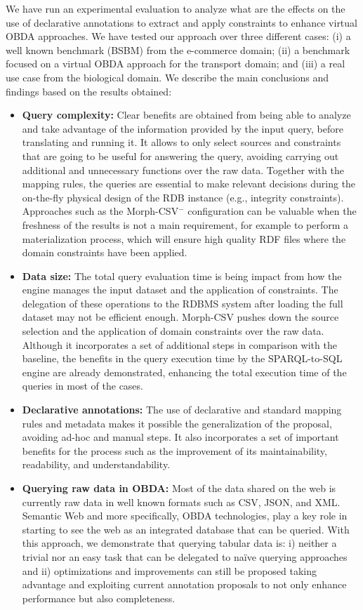 We have run an experimental evaluation to analyze what are the effects on the use of declarative annotations to extract and apply constraints to enhance virtual OBDA approaches. We have tested our approach over three different cases: (i) a well known benchmark (BSBM) from the e-commerce domain; (ii) a benchmark focused on a virtual OBDA approach for the transport domain; and (iii) a real use case from the biological domain. We describe the main conclusions and findings based on the results obtained:
\begin{itemize}
    \item \textbf{Query complexity:} Clear benefits are obtained from being able to analyze and take advantage of the information provided by the input query, before translating and running it. It allows to only select sources and constraints that are going to be useful for answering the query, avoiding carrying out additional and unnecessary functions over the raw data. Together with the mapping rules, the queries are essential to make relevant decisions during the on-the-fly physical design of the RDB instance (e.g., integrity constraints). Approaches such as the Morph-CSV$^-$ configuration can be valuable when the freshness of the results is not a main requirement, for example to perform a materialization process, which will ensure high quality RDF files where the domain constraints have been applied.
    \item \textbf{Data size:} The total query evaluation time is being impact from how the engine manages the input dataset and the application of constraints. The delegation of these operations to the RDBMS system after loading the full dataset may not be efficient enough. Morph-CSV pushes down the source selection and the application of domain constraints over the raw data. Although it incorporates a set of additional steps in comparison with the baseline, the benefits in the query execution time by the SPARQL-to-SQL engine are already demonstrated, enhancing the total execution time of the queries in most of the cases.
    \item \textbf{Declarative annotations:} The use of declarative and standard mapping rules and metadata makes it possible the generalization of the proposal, avoiding ad-hoc and manual steps. It also incorporates a set of important benefits for the process such as the improvement of its maintainability, readability, and understandability.
    \item \textbf{Querying raw data in OBDA:} Most of the data shared on the web is currently raw data in well known formats such as CSV, JSON, and XML. Semantic Web and more specifically, OBDA technologies, play a key role in starting to see the web as an integrated  database that can be queried. With this approach, we demonstrate that querying tabular data is: i) neither a trivial nor an easy task that can be delegated to na\"ive querying approaches and ii) optimizations and improvements can still be proposed taking advantage and exploiting current annotation proposals to not only enhance performance but also completeness.
\end{itemize}




